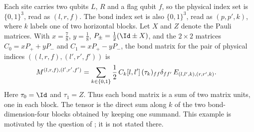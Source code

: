 \begin{definition}%
    \label{def:mpdo_twisted_dimer_tensor}
    \leanok
    Each site carries two qubits $L$, $R$ and a flag qubit $f$, so the
    physical index set is $\{0,1\}^3$, read as $(l,r,f)$. The bond index set
    is also $\{0,1\}^3$, read as $(p,p',k)$, where $k$ labels one of two
    horizontal blocks. Let $X$ and $Z$ denote the Pauli matrices.
    With $x=\frac78$, $y=\frac18$, $P_\pm=\frac12(\Id\pm X)$,
    and the $2\times2$ matrices $C_0=xP_++yP_-$ and
    $C_1=xP_+-yP_-$, the bond matrix for the pair of physical indices
    $((l,r,f),(l',r',f'))$ is
    \begin{align}
        M^{(l,r,f),(l',r',f')}
         & =\sum_{k\in\{0,1\}}\frac12\,C_k[l,l']\,(\tau_k)_{ff}
        \delta_{ff'}\,E_{(l,l',k),(r,r',k)}.
        \notag
    \end{align}
    Here $\tau_0=\Id$ and $\tau_1=Z$. Thus each bond matrix is a sum of
    two matrix units, one in each block. The tensor is the direct sum
    along $k$ of the two bond-dimension-four blocks obtained by keeping
    one summand. This example is motivated by the question of
    \cite[lines~995--1010]{Cirac2016MPDO_arXiv}; it is not stated there.
\end{definition}

